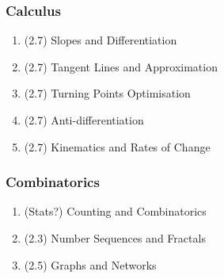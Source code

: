 \subsubsection*{Calculus}
\begin{enumerate}[resume]
  \item (2.7) Slopes and Differentiation
  \item (2.7) Tangent Lines and Approximation
  \item (2.7) Turning Points Optimisation
  \item (2.7) Anti-differentiation
  \item (2.7) Kinematics and Rates of Change
\end{enumerate}

\subsubsection*{Combinatorics}
\begin{enumerate}[resume]
  \item (Stats?) Counting and Combinatorics
  \item (2.3) Number Sequences and Fractals
  \item (2.5) Graphs and Networks
\end{enumerate}


